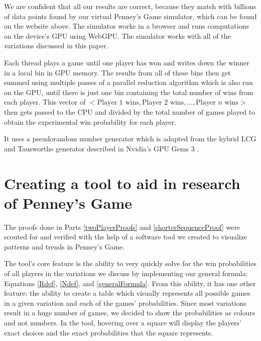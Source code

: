 \documentclass[english,12pt,a4paper,final]{article}
\begin{document}
We are confident that all our results are correct, because they match with billions of data points found by our virtual Penney's Game simulator, which can be found on the website above. The simulator works in a browser and runs computations on the device's GPU using WebGPU. The simulator works with all of the variations discussed in this paper.

Each thread plays a game until one player has won and writes down the winner in a local bin in GPU memory. The results from all of these bins then get summed using multiple passes of a parallel reduction algorithm which is also run on the GPU, until there is just one bin containing the total number of wins from each player. This vector of $<\text{Player 1 wins}, \text{Player 2 wins}, ..., \text{Player $n$ wins}>$ then gets passed to the CPU and divided by the total number of games played to obtain the experimental win probability for each player.

It uses a pseudorandom number generator which is adapted from the hybrid LCG and Tausworthe generator described in Nvidia's GPU Gems 3 \parencite{prng}.

\section {Creating a tool to aid in research of Penney's Game}

The proofs done in Parts \ref{twoPlayerProofs} and \ref{shorterSequenceProof} were scouted for and verified with the help of a software tool we created to visualize patterns and trends in Penney's Game.

The tool's core feature is the ability to very quickly solve for the win probabilities of all players in the variations we discuss by implementing our general formula: Equations \eqref{Rdef}, \eqref{Ndef}, and \eqref{generalFormula}. From this ability, it has one other feature: the ability to create a table which visually represents all possible games in a given variation and each of the games' probabilities. Since most variations result in a huge number of games, we decided to show the probabilities as colours and not numbers. In the tool, hovering over a square will display the players' exact choices and the exact probabilities that the square represents.
\end{document}
